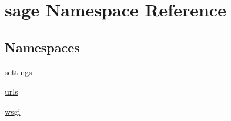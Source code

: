 \hypertarget{namespacesage}{}\section{sage Namespace Reference}
\label{namespacesage}
\subsection*{Namespaces}
\begin{DoxyCompactItemize}
\item 
 \hyperlink{namespacesage_1_1settings}{settings}
\item 
 \hyperlink{namespacesage_1_1urls}{urls}
\item 
 \hyperlink{namespacesage_1_1wsgi}{wsgi}
\end{DoxyCompactItemize}
